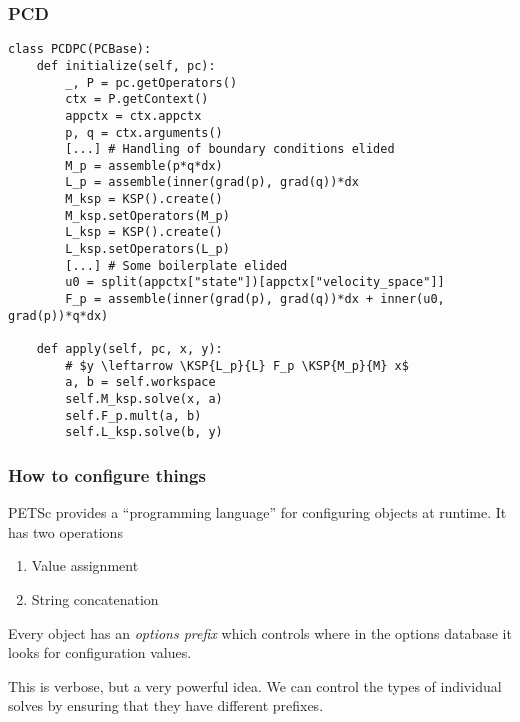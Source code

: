 \documentclass[presentation]{beamer}
\newcommand{\KSP}[2]{\ensuremath{\mathcal{K}\left(#1, \mathbb{#2}\right)}}
\begin{document}
\begin{frame}[fragile]
  \frametitle{PCD}
\begin{verbatim}
class PCDPC(PCBase):
    def initialize(self, pc):
        _, P = pc.getOperators()
        ctx = P.getContext()
        appctx = ctx.appctx
        p, q = ctx.arguments()
        [...] # Handling of boundary conditions elided
        M_p = assemble(p*q*dx)
        L_p = assemble(inner(grad(p), grad(q))*dx
        M_ksp = KSP().create()
        M_ksp.setOperators(M_p)
        L_ksp = KSP().create()
        L_ksp.setOperators(L_p)
        [...] # Some boilerplate elided
        u0 = split(appctx["state"])[appctx["velocity_space"]]
        F_p = assemble(inner(grad(p), grad(q))*dx + inner(u0, grad(p))*q*dx)

    def apply(self, pc, x, y):
        # $y \leftarrow \KSP{L_p}{L} F_p \KSP{M_p}{M} x$
        a, b = self.workspace
        self.M_ksp.solve(x, a)
        self.F_p.mult(a, b)
        self.L_ksp.solve(b, y)
\end{verbatim}
\end{frame}

\begin{frame}
  \frametitle{How to configure things}

  PETSc provides a ``programming language'' for configuring objects at
  runtime.  It has two operations

  \begin{enumerate}
  \item Value assignment
  \item String concatenation
  \end{enumerate}

  Every object has an \emph{options prefix} which controls where in
  the options database it looks for configuration values.

  This is verbose, but a very powerful idea.  We can control the types
  of individual solves by ensuring that they have different prefixes.
\end{frame}
\end{document}
